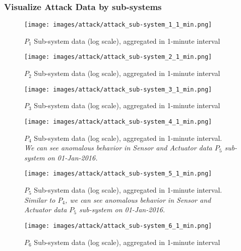 \documentclass{article}
\begin{document}
\subsubsection{Visualize Attack Data by sub-systems}
    \begin{figure}[!ht]
        \texttt{[image: images/attack/attack\_sub-system\_1\_1\_min.png]}
        \caption{$P_1$ Sub-system data (log scale), aggregated in 1-minute interval}
        \label{fig:attack-P1}            

        \texttt{[image: images/attack/attack\_sub-system\_2\_1\_min.png]}
        \caption{$P_2$ Sub-system data (log scale), aggregated in 1-minute interval}
        \label{fig:attack-P2}            

        \texttt{[image: images/attack/attack\_sub-system\_3\_1\_min.png]}
        \caption{$P_3$ Sub-system data (log scale), aggregated in 1-minute interval}
        \label{fig:attack-P3}  
    \end{figure}
    \clearpage
    \begin{figure}[!ht]
        \texttt{[image: images/attack/attack\_sub-system\_4\_1\_min.png]}
        \caption{$P_4$ Sub-system data (log scale), aggregated in 1-minute interval. \\
        \textit{We can see anomalous behavior in Sensor and Actuator data $P_5$ sub-system on 01-Jan-2016.}}
        \label{fig:attack-P4}            

        \texttt{[image: images/attack/attack\_sub-system\_5\_1\_min.png]}
        \caption{$P_5$ Sub-system data (log scale), aggregated in 1-minute interval. \\
        \textit{Similar to $P_4$, we can see anomalous behavior in Sensor and Actuator data $P_5$ sub-system on 01-Jan-2016.}}
        \label{fig:attack-P5}            

        \texttt{[image: images/attack/attack\_sub-system\_6\_1\_min.png]}
        \caption{$P_6$ Sub-system data (log scale), aggregated in 1-minute interval}
        \label{fig:attack-P6}            
    \end{figure}

\clearpage
\end{document}
